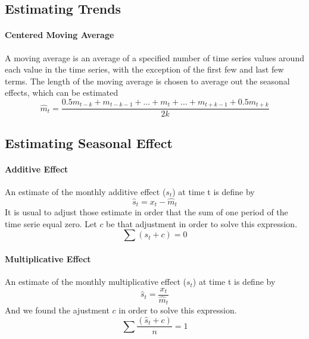 \subsection{Estimating Trends}

\paragraph{Centered Moving Average}
A moving average is an average of a specified number of time series values around each value in the time series, with the exception of the first few and last few terms.
The length of the moving average is chosen to average out the seasonal effects, which can be estimated
\[ \hat{m}_t = \frac{0.5m_{t-k} + m_{t-k-1} + ... + m_t + ... + m_{t+k-1} + 0.5m_{t+k}}{2k} \]

\subsection{Estimating Seasonal Effect}

\paragraph{Additive Effect}
An estimate of the monthly additive effect ($s_t$) at time t is define by
\[ \hat{s}_t = x_t - \hat{m}_t \]
It is usual to adjust those estimate in order that the sum of one period of the time serie equal zero. Let $c$ be that adjustment in order to solve this expression.
\[ \sum (s_t + c) = 0 \]

\paragraph{Multiplicative Effect}
An estimate of the monthly multiplicative effect ($s_t$) at time t is define by
\[ \hat{s}_t = \frac{x_t}{\hat{m}_t} \]
And we found the ajustment $c$ in order to solve this expression.
\[ \sum \frac{(\hat{s}_t + c)}{n} = 1 \] 

